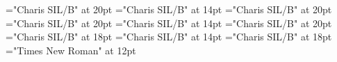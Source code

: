 \documentclass[a4paper]{article}
\begin{document}
 
\pagestyle{plain} 
\font\spannkoTitleMainNormalscrBookscrBody="Charis SIL/B" at 20pt
\font\TitleSecondarynkoTitleMainNormalscrBookscrBody="Charis SIL/B" at 14pt
\font\TitleMainNormalscrBookscrBody="Charis SIL/B" at 20pt
\font\spannkoTitleMainNonescrBookscrBody="Charis SIL/B" at 20pt
\font\TitleSecondarynkoTitleMainNonescrBookscrBody="Charis SIL/B" at 14pt
\font\TitleMainNonescrBookscrBody="Charis SIL/B" at 20pt
\font\spannkoTitleMainscrBookscrBody="Charis SIL/B" at 18pt
\font\TitleSecondarynkoTitleMainscrBookscrBody="Charis SIL/B" at 14pt
\font\TitleMainscrBookscrBody="Charis SIL/B" at 18pt
\font\scrBookscrBody="Times New Roman" at 12pt
\pagestyle{fancy} 
\begin{adjustwidth}{36pt}{0pt}{12pt}{0pt}\begin{spacing}{1}\begin{center}


\end{center}\end{spacing}\end{adjustwidth} \begin{adjustwidth}{36pt}{0pt}{12pt}{0pt}\begin{spacing}{0}\begin{center}


\end{center}\end{spacing}\end{adjustwidth} \begin{adjustwidth}{36pt}{0pt}{12pt}{0pt}\begin{spacing}{1.5}\begin{center}


\end{center}\end{spacing}\end{adjustwidth} 
\end{document}
